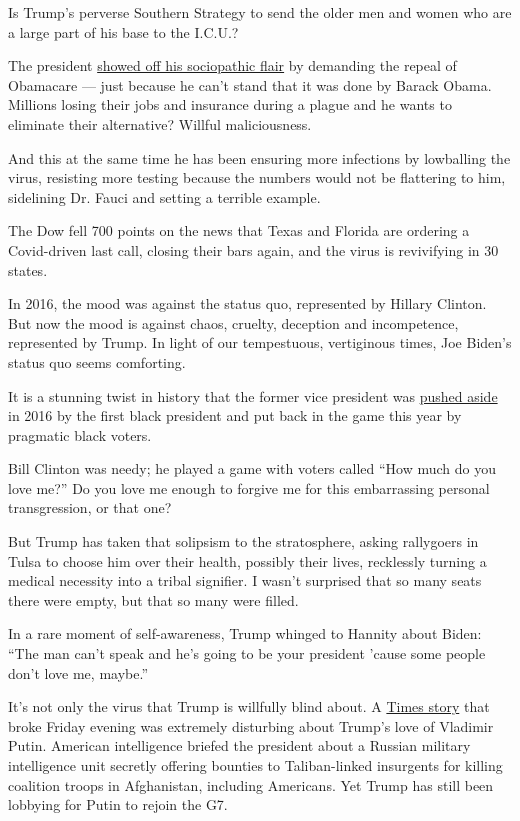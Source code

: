 Is Trump's perverse Southern Strategy to send the older men and women
who are a large part of his base to the I.C.U.?

The president
\href{https://www.nytimes3xbfgragh.onion/2020/06/26/us/politics/obamacare-trump-administration-supreme-court.html}{showed
off his sociopathic flair} by demanding the repeal of Obamacare --- just
because he can't stand that it was done by Barack Obama. Millions losing
their jobs and insurance during a plague and he wants to eliminate their
alternative? Willful maliciousness.

And this at the same time he has been ensuring more infections by
lowballing the virus, resisting more testing because the numbers would
not be flattering to him, sidelining Dr. Fauci and setting a terrible
example.

The Dow fell 700 points on the news that Texas and Florida are ordering
a Covid-driven last call, closing their bars again, and the virus is
revivifying in 30 states.

In 2016, the mood was against the status quo, represented by Hillary
Clinton. But now the mood is against chaos, cruelty, deception and
incompetence, represented by Trump. In light of our tempestuous,
vertiginous times, Joe Biden's status quo seems comforting.

It is a stunning twist in history that the former vice president was
\href{https://www.nytimes3xbfgragh.onion/2019/08/16/us/politics/biden-obama-history.html}{pushed
aside} in 2016 by the first black president and put back in the game
this year by pragmatic black voters.

Bill Clinton was needy; he played a game with voters called ``How much
do you love me?'' Do you love me enough to forgive me for this
embarrassing personal transgression, or that one?

But Trump has taken that solipsism to the stratosphere, asking
rallygoers in Tulsa to choose him over their health, possibly their
lives, recklessly turning a medical necessity into a tribal signifier. I
wasn't surprised that so many seats there were empty, but that so many
were filled.

In a rare moment of self-awareness, Trump whinged to Hannity about
Biden: ``The man can't speak and he's going to be your president 'cause
some people don't love me, maybe.''

It's not only the virus that Trump is willfully blind about. A
\href{https://www.nytimes3xbfgragh.onion/2020/06/26/us/politics/russia-afghanistan-bounties.html}{Times
story} that broke Friday evening was extremely disturbing about Trump's
love of Vladimir Putin. American intelligence briefed the president
about a Russian military intelligence unit secretly offering bounties to
Taliban-linked insurgents for killing coalition troops in Afghanistan,
including Americans. Yet Trump has still been lobbying for Putin to
rejoin the G7.


